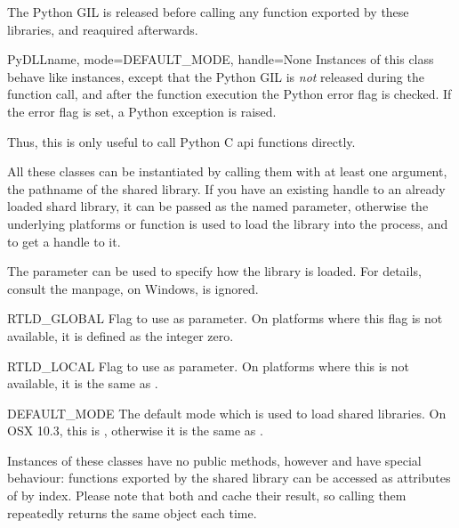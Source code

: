 The Python GIL is released before calling any function exported by
these libraries, and reaquired afterwards.

\begin{classdesc}{PyDLL}{name, mode=DEFAULT_MODE, handle=None}
Instances of this class behave like  instances, except
that the Python GIL is \emph{not} released during the function call,
and after the function execution the Python error flag is checked.
If the error flag is set, a Python exception is raised.

Thus, this is only useful to call Python C api functions directly.
\end{classdesc}

All these classes can be instantiated by calling them with at least
one argument, the pathname of the shared library.  If you have an
existing handle to an already loaded shard library, it can be passed
as the  named parameter, otherwise the underlying platforms
 or  function is used to load the library
into the process, and to get a handle to it.

The  parameter can be used to specify how the library is
loaded.  For details, consult the  manpage, on Windows,
 is ignored.

\begin{datadescni}{RTLD_GLOBAL}
Flag to use as  parameter.  On platforms where this flag
is not available, it is defined as the integer zero.
\end{datadescni}

\begin{datadescni}{RTLD_LOCAL}
Flag to use as  parameter.  On platforms where this is not
available, it is the same as .
\end{datadescni}

\begin{datadescni}{DEFAULT_MODE}
The default mode which is used to load shared libraries.  On OSX
10.3, this is , otherwise it is the same as
.
\end{datadescni}

Instances of these classes have no public methods, however
 and  have special behaviour: functions
exported by the shared library can be accessed as attributes of by
index.  Please note that both  and 
cache their result, so calling them repeatedly returns the same object
each time.

